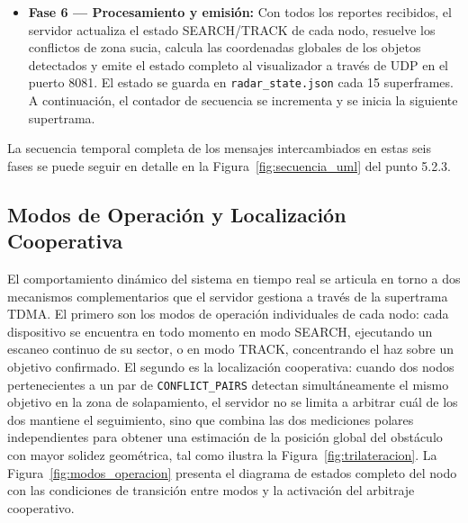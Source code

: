 \begin{itemize}[topsep=4pt, partopsep=0pt, itemsep=6pt, parsep=0pt]
    \item \textbf{Fase 6 --- Procesamiento y emisión:} Con todos los reportes recibidos, el servidor actualiza el estado SEARCH/TRACK de cada nodo, resuelve los conflictos de zona sucia, calcula las coordenadas globales de los objetos detectados y emite el estado completo al visualizador a través de UDP en el puerto 8081. El estado se guarda en \texttt{radar\_state.json} cada 15 superframes. A continuación, el contador de secuencia se incrementa y se inicia la siguiente supertrama.
\end{itemize}

La secuencia temporal completa de los mensajes intercambiados en estas seis fases se puede seguir en detalle en la Figura~\ref{fig:secuencia_uml} del punto 5.2.3.

\subsection{Modos de Operación y Localización Cooperativa}

El comportamiento dinámico del sistema en tiempo real se articula en torno a dos mecanismos complementarios que el servidor gestiona a través de la supertrama TDMA. El primero son los modos de operación individuales de cada nodo: cada dispositivo se encuentra en todo momento en modo SEARCH, ejecutando un escaneo continuo de su sector, o en modo TRACK, concentrando el haz sobre un objetivo confirmado. El segundo es la localización cooperativa: cuando dos nodos pertenecientes a un par de \texttt{CONFLICT\_PAIRS} detectan simultáneamente el mismo objetivo en la zona de solapamiento, el servidor no se limita a arbitrar cuál de los dos mantiene el seguimiento, sino que combina las dos mediciones polares independientes para obtener una estimación de la posición global del obstáculo con mayor solidez geométrica, tal como ilustra la Figura~\ref{fig:trilateracion}. La Figura~\ref{fig:modos_operacion} presenta el diagrama de estados completo del nodo con las condiciones de transición entre modos y la activación del arbitraje cooperativo.


